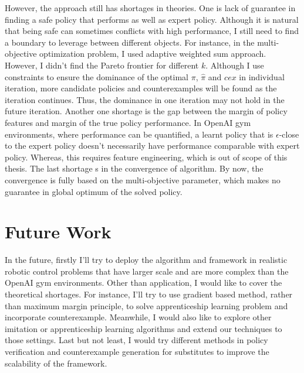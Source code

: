 However, the approach still has shortages in theories. One is lack of guarantee in finding a safe policy that performs as well as expert policy. Although it is natural that being safe can sometimes conflicts with high performance, I still need to find a boundary to leverage between different objects. For instance, in the multi-objective optimization problem, I used adaptive weighted sum approach. However, I didn't find the Pareto frontier for different $k$. Although I use constraints to ensure the dominance of the optimal $\pi$, $\hat{\pi}$ and $cex$ in individual iteration, more candidate policies and counterexamples will be found as the iteration continues. Thus, the dominance in one iteration may not hold in the future iteration. Another one shortage is the gap between the margin of policy features and margin of the true policy performance. In OpenAI gym environments, where performance can be quantified, a learnt policy that is {$\epsilon$-close} to the expert policy doesn't necessarily have performance comparable with expert policy. Whereas, this requires feature engineering, which is out of scope of this thesis. The last shortage s in the convergence of algorithm. By now, the convergence is fully based on the multi-objective parameter, which makes no guarantee in global optimum of the solved policy.

\section{Future Work}
In the future, firstly I'll try to deploy the algorithm and framework in realistic robotic control problems that have larger scale and are more complex than the OpenAI gym environments. Other than application, I would like to cover the theoretical shortages. For instance, I'll try to use gradient based method, rather than maximum margin principle, to solve apprenticeship learning problem and incorporate counterexample. Meanwhile, I would also like to explore other imitation or apprenticeship learning algorithms and extend our techniques to those settings. Last but not least, I would try different methods in policy verification and counterexample generation for substitutes to improve the scalability of the framework.

